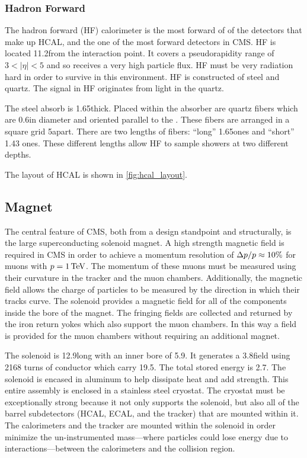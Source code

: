 \subsubsection{Hadron Forward}

The hadron forward (HF) calorimeter is the most forward of of the detectors
that make up HCAL, and the one of the most forward detectors in CMS. HF is
located 11.2\meters from the interaction point. It covers a pseudorapidity
range of $3 < |\eta| < 5$ and so receives a very high particle flux. HF must be
very radiation hard in order to survive in this environment. HF is constructed
of steel and quartz. The signal in HF originates from \Cherenkov light in the
quartz.

The steel absorb is 1.65\meters thick. Placed within the absorber are quartz
fibers which are 0.6\millimeters in diameter and oriented parallel to the
\zaxis. These fibers are arranged in a square grid 5\millimeters apart. There
are two lengths of fibers: ``long'' 1.65\meters ones and ``short'' 1.43\meters
ones. These different lengths allow HF to sample showers at two different
depths.

The layout of HCAL is shown in \cref{fig:hcal_layout}.

\subsection{Magnet}

The central feature of CMS, both from a design standpoint and structurally, is
the large superconducting solenoid magnet. A high strength magnetic field is
required in CMS in order to achieve a momentum resolution of $\Delta p
/ p \approx 10\%$ for muons with $p = 1 \,\text{Te\hspace{-.08em}V}$. The momentum of
these muons must be measured using their curvature in the tracker and the muon
chambers. Additionally, the magnetic field allows the charge of particles to be
measured by the direction in which their tracks curve. The solenoid provides a
magnetic field for all of the components inside the bore of the magnet. The
fringing fields are collected and returned by the iron return yokes which also
support the muon chambers. In this way a field is provided for the muon
chambers without requiring an additional magnet.

The solenoid is 12.9\meters long with an inner bore of 5.9\meters. It generates
a 3.8\tesla field using 2168 turns of conductor which carry 19.5\kiloamps. The
total stored energy is 2.7\gigajoules. The solenoid is encased in aluminum to
help dissipate heat and add strength. This entire assembly is enclosed in a
stainless steel cryostat. The cryostat must be exceptionally strong because it
not only supports the solenoid, but also all of the barrel subdetectors (HCAL,
ECAL, and the tracker) that are mounted within it. The calorimeters and the
tracker are mounted within the solenoid in order minimize the un-instrumented
mass---where particles could lose energy due to interactions---between the
calorimeters and the collision region.

